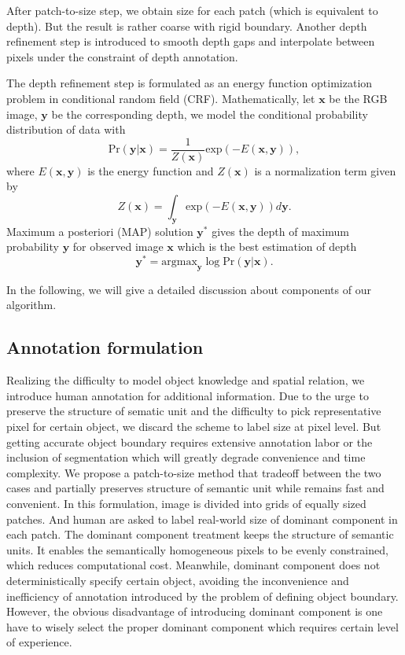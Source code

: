 \documentclass[10pt,twocolumn,letterpaper]{article}
\begin{document}
After patch-to-size step, we obtain size for each patch (which is equivalent to depth). But the result is rather coarse with rigid boundary. Another depth refinement step is introduced to smooth depth gaps and interpolate between pixels under the constraint of depth annotation.

The depth refinement step is formulated as an energy function optimization problem in conditional random field (CRF). Mathematically, let $\mathbf{x}$ be the RGB image, $\mathbf{y}$ be the corresponding depth, we model the conditional probability distribution of data with
\begin{equation}
\text{Pr}(\mathbf{y}|\mathbf{x}) = \frac{1}{Z(\mathbf{x})}\text{exp}(-E(\mathbf{x}, \mathbf{y})),
\end{equation}
where $E(\mathbf{x}, \mathbf{y})$ is the energy function and $Z(\mathbf{x})$ is a normalization term given by
\begin{equation}
Z(\mathbf{x}) = \int_{\mathbf{y}}\text{exp}(-E(\mathbf{x}, \mathbf{y})) d\mathbf{y}.
\end{equation}
Maximum a posteriori (MAP) solution $\mathbf{y}^*$ gives the depth of maximum probability $\mathbf{y}$ for observed image $\mathbf{x}$ which is the best estimation of depth
\begin{equation}
\mathbf{y^*} = \text{argmax}_{\mathbf{y}} \log \text{Pr}(\mathbf{y}|\mathbf{x}).
\end{equation}
\par
In the following, we will give a detailed discussion about components of our algorithm.
\subsection{Annotation formulation}
Realizing the difficulty to model object knowledge and spatial relation, we introduce human annotation for additional information. Due to the urge to preserve the structure of sematic unit and the difficulty to pick representative pixel for certain object, we discard the scheme to label size at pixel level. But getting accurate object boundary requires extensive annotation labor or the inclusion of segmentation which will greatly degrade convenience and time complexity. We propose a patch-to-size method that tradeoff between the two cases and partially preserves structure of semantic unit while remains fast and convenient. In this formulation, image is divided into grids of equally sized patches. And human are asked to label real-world size of dominant component in each patch. The dominant component treatment keeps the structure of semantic units. It enables the semantically homogeneous pixels to be evenly constrained, which reduces computational cost. Meanwhile, dominant component does not deterministically specify certain object, avoiding the inconvenience and inefficiency of annotation introduced by the problem of defining object boundary. However, the obvious disadvantage of introducing dominant component is one have to wisely select the proper dominant component which requires certain level of experience.
\end{document}
